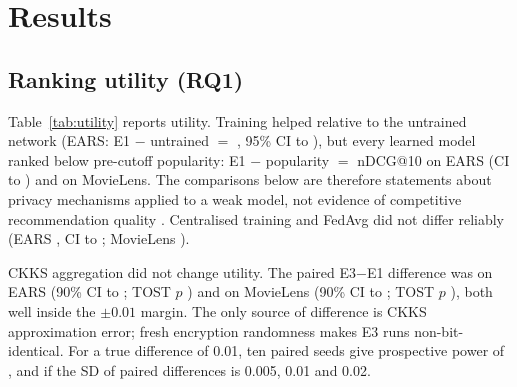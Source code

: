 \documentclass[11pt,a4paper]{article}
\begin{document}
\section{Results}



\subsection{Ranking utility (RQ1)}

Table~\ref{tab:utility} reports utility. Training helped relative to the untrained network (EARS: E1 $-$ untrained $=$ , 95\% CI  to ), but every learned model ranked below pre-cutoff popularity: E1 $-$ popularity $=$  nDCG@10 on EARS (CI  to ) and  on MovieLens. The comparisons below are therefore statements about privacy mechanisms applied to a weak model, not evidence of competitive recommendation quality \cite{ferraridacrema2019really}. Centralised training and FedAvg did not differ reliably (EARS , CI  to ; MovieLens ).

CKKS aggregation did not change utility. The paired E3$-$E1 difference was  on EARS (90\% CI  to ; TOST $p$ ) and  on MovieLens (90\% CI  to ; TOST $p$ ), both well inside the $\pm0.01$ margin. The only source of difference is CKKS approximation error; fresh encryption randomness makes E3 runs non-bit-identical. For a true difference of 0.01, ten paired seeds give prospective power of ,  and  if the SD of paired differences is 0.005, 0.01 and 0.02.
\end{document}
